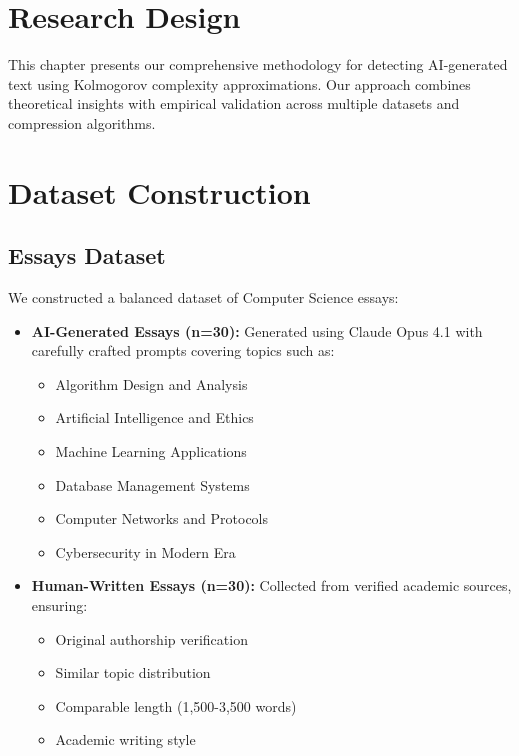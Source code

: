\documentclass[12pt,a4paper]{report}
\begin{document}
\section{Research Design}

This chapter presents our comprehensive methodology for detecting AI-generated text using Kolmogorov complexity approximations. Our approach combines theoretical insights with empirical validation across multiple datasets and compression algorithms.

\section{Dataset Construction}

\subsection{Essays Dataset}

We constructed a balanced dataset of Computer Science essays:

\begin{itemize}
    \item \textbf{AI-Generated Essays (n=30):} Generated using Claude Opus 4.1 with carefully crafted prompts covering topics such as:
    \begin{itemize}
        \item Algorithm Design and Analysis
        \item Artificial Intelligence and Ethics
        \item Machine Learning Applications
        \item Database Management Systems
        \item Computer Networks and Protocols
        \item Cybersecurity in Modern Era
    \end{itemize}

    \item \textbf{Human-Written Essays (n=30):} Collected from verified academic sources, ensuring:
    \begin{itemize}
        \item Original authorship verification
        \item Similar topic distribution
        \item Comparable length (1,500-3,500 words)
        \item Academic writing style
    \end{itemize}
\end{itemize}
\end{document}
